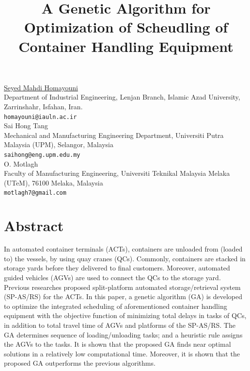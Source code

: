 \documentclass[article, A4, 11pt]{llncs}%
\begin{document}
\title{A Genetic Algorithm for Optimization of Scheudling of Container Handling Equipment}
 \author{} \institute{}
\maketitle
\begin{center}
{\large \underline{Seyed Mahdi Homayouni}}\\
Department of Industrial Engineering, Lenjan Branch, Islamic Azad University, Zarrinshahr, Isfahan, Iran.\\
{\tt homayouni@iauln.ac.ir}
\\ \vspace{4mm}
{\large Sai Hong Tang}\\
Mechanical and Manufacturing Engineering Department, Universiti Putra Malaysia (UPM), Selangor, Malaysia\\
{\tt saihong@eng.upm.edu.my}
\\ \vspace{4mm}
{\large O.  Motlagh}\\
Faculty of Manufacturing Engineering, Universiti Teknikal Malaysia Melaka (UTeM), 76100 Melaka, Malaysia\\
{\tt motlagh7@gmail.com}
\end{center}

\section*{Abstract}
In automated container terminals (ACTs), containers are unloaded from (loaded to) the vessels, by using quay cranes (QCs). Commonly, containers are stacked in storage yards before they delivered to final customers. Moreover, automated guided vehicles (AGVs) are used to connect the QCs to the storage yard. Previous researches proposed split-platform automated storage/retrieval system (SP-AS/RS) for the ACTs. In this paper, a genetic algorithm (GA) is developed to optimize the integrated scheduling of aforementioned container handling equipment with the objective function of minimizing total delays in tasks of QCs, in addition to total travel time of AGVs and platforms of the SP-AS/RS. The GA determines sequence of loading/unloading tasks; and a heuristic rule assigns the AGVs to the tasks. It is shown that the proposed GA finds near optimal solutions in a relatively low computational time. Moreover, it is shown that the proposed GA outperforms the previous algorithms.
\end{document}
